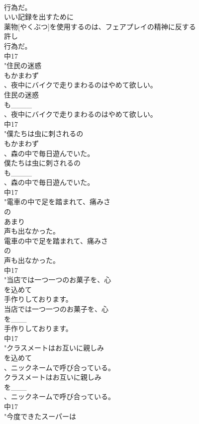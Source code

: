 \documentclass[8pt]{extreport}
\begin{document}
\begin{CJK}{UTF8}{min}
\\	行為だ。
\\	いい記録を出すために
\\	薬物[やくぶつ]を使用するのは、フェアプレイの精神に反する
\\	許し
\\	行為だ。
\\	中17
\\	"住民の迷惑
\\	もかまわず
\\	、夜中にバイクで走りまわるのはやめて欲しい。
\\	住民の迷惑
\\	も____
\\	、夜中にバイクで走りまわるのはやめて欲しい。
\\	中17
\\	"僕たちは虫に刺されるの
\\	もかまわず
\\	、森の中で毎日遊んでいた。
\\	僕たちは虫に刺されるの
\\	も____
\\	、森の中で毎日遊んでいた。
\\	中17
\\	"電車の中で足を踏まれて、痛みさ
\\	の
\\	あまり
\\	声も出なかった。
\\	電車の中で足を踏まれて、痛みさ
\\	の
\\	声も出なかった。
\\	中17
\\	"当店では一つ一つのお菓子を、心
\\	を込めて
\\	手作りしております。
\\	当店では一つ一つのお菓子を、心
\\	を___
\\	手作りしております。
\\	中17
\\	"クラスメートはお互いに親しみ
\\	を込めて
\\	、ニックネームで呼び合っている。
\\	クラスメートはお互いに親しみ
\\	を___
\\	、ニックネームで呼び合っている。
\\	中17
\\	"今度できたスーパーは

\end{CJK}
\end{document}
